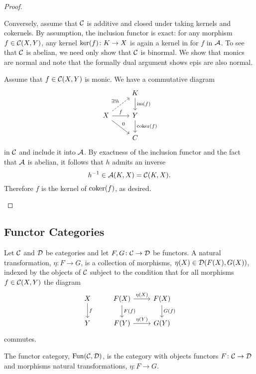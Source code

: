 \documentclass[reqno, 12pt]{amsart}
\begin{document}
\begin{proof}
\begin{enumerate}
    
    Conversely, assume that $\mathcal{C}$ is additive and closed under taking kernels and cokernels.
    By assumption, the inclusion functor is exact: for any morphism $f \in \mathcal{C}(X,Y)$, any kernel $\operatorname{ker}(f) \colon K \to X$ is again a kernel in for $f$ in $\mathcal{A}$.
    To see that $\mathcal{C}$ is abelian, we need only show that $\mathcal{C}$ is binormal.
    We show that monics are normal and note that the formally dual argument shows epis are also normal.
    
    Assume that $f \in \mathcal{C}(X,Y)$ is monic.
    We have a commutative diagram
    $$\begin{tikzcd}
      & K \arrow{d}{\op{im}(f)}\\
      X \arrow{rd}{0}\arrow{r}{f}\arrow[dashed]{ur}{\exists !h} & Y  \arrow{d}{\op{coker}(f)} \\& C
    \end{tikzcd}$$
    in $\mathcal{C}$ and include it into $\mathcal{A}$.
    By exactness of the inclusion functor and the fact that $\mathcal{A}$ is abelian, it follows that $h$ admits an inverse
    $$h^{-1} \in \mathcal{A}(K, X) = \mathcal{C}(K,X).$$
    Therefore $f$ is the kernel of $\operatorname{coker}(f)$, as desired.
  \end{enumerate}
\end{proof}

\subsection{Functor Categories}
Let $\mathcal{C}$ and $\mathcal{D}$ be categories and let $F, G \colon \mathcal{C} \to \mathcal{D}$ be functors.
A natural transformation, $\eta \colon F \to G$, is a collection of morphisms, $\eta(X) \in \mathcal{D}(F(X), G(X))$, indexed by the objects of $\mathcal{C}$ subject to the condition that for all morphisms $f \in \mathcal{C}(X,Y)$ the diagram
$$\begin{tikzcd}
  X \arrow{d}{f} & F(X)\arrow{d}{F(f)}\arrow{r}{\eta(X)} & F(X)\arrow{d}{G(f)}\\
  Y & F(Y) \arrow{r}{\eta(Y)} & G(Y)
\end{tikzcd}$$
commutes.

The functor category, $\operatorname{Fun}(\mathcal{C},\mathcal{D})$, is the category with objects functors $F \colon \mathcal{C} \to \mathcal{D}$ and morphisms natural transformations, $\eta \colon F \to G$.
\end{document}
